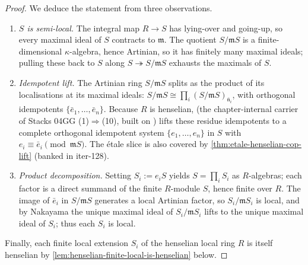 \begin{proof}
  We deduce the statement from three observations.
  \begin{enumerate}
    \item \emph{$S$ is semi-local.} The integral map $R \to S$ has
      lying-over and going-up, so every maximal ideal of $S$ contracts
      to $\mathfrak{m}$. The quotient $S / \mathfrak{m} S$ is a
      finite-dimensional $\kappa$-algebra, hence Artinian, so it has
      finitely many maximal ideals; pulling these back to $S$ along
      $S \twoheadrightarrow S/\mathfrak{m} S$ exhausts the maximals of
      $S$.
    \item \emph{Idempotent lift.} The Artinian ring $S/\mathfrak{m} S$
      splits as the product of its localisations at its maximal ideals:
      $S/\mathfrak{m} S \cong \prod_{i} (S/\mathfrak{m} S)_{\bar{\mathfrak{n}}_{i}}$,
      with orthogonal idempotents $\{\bar e_{1}, \dots, \bar e_{n}\}$.
      Because $R$ is henselian,
      (the chapter-internal carrier of Stacks
      04GG (1)$\Rightarrow$(10), built on
      )
      lifts these residue idempotents to a complete orthogonal
      idempotent system $\{e_{1}, \dots, e_{n}\}$ in $S$ with
      $e_{i} \equiv \bar e_{i} \pmod{\mathfrak{m} S}$. The étale
      slice is also covered by
      \cref{thm:etale-henselian-cop-lift} (banked in iter-128).
    \item \emph{Product decomposition.} Setting $S_{i} := e_{i} S$
      yields $S = \prod_{i} S_{i}$ as $R$-algebras; each factor is a
      direct summand of the finite $R$-module $S$, hence finite over
      $R$. The image of $\bar e_{i}$ in $S/\mathfrak{m} S$ generates a
      local Artinian factor, so $S_{i}/\mathfrak{m} S_{i}$ is local,
      and by Nakayama the unique maximal ideal of $S_{i}/\mathfrak{m}
      S_{i}$ lifts to the unique maximal ideal of $S_{i}$; thus each
      $S_{i}$ is local.
  \end{enumerate}
  Finally, each finite local extension $S_{i}$ of the henselian local
  ring $R$ is itself henselian by
  \cref{lem:henselian-finite-local-is-henselian} below.
\end{proof}

